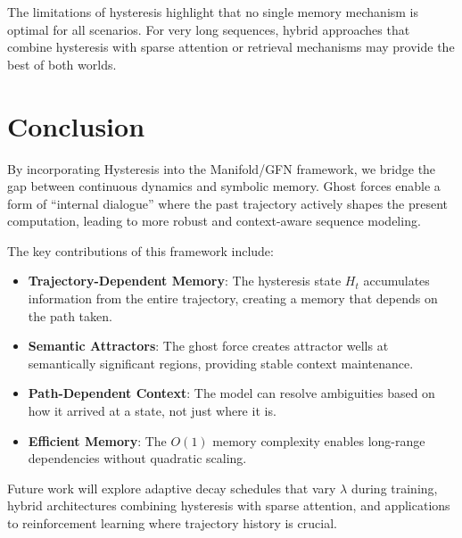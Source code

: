 \documentclass[12pt,a4paper]{article}
\begin{document}
The limitations of hysteresis highlight that no single memory mechanism is optimal for all scenarios. For very long sequences, hybrid approaches that combine hysteresis with sparse attention or retrieval mechanisms may provide the best of both worlds.

\section{Conclusion}

By incorporating Hysteresis into the Manifold/GFN framework, we bridge the gap between continuous dynamics and symbolic memory. Ghost forces enable a form of ``internal dialogue'' where the past trajectory actively shapes the present computation, leading to more robust and context-aware sequence modeling.

The key contributions of this framework include:

\begin{itemize}[leftmargin=1cm]
\item \textbf{Trajectory-Dependent Memory}: The hysteresis state $H_t$ accumulates information from the entire trajectory, creating a memory that depends on the path taken.

\item \textbf{Semantic Attractors}: The ghost force creates attractor wells at semantically significant regions, providing stable context maintenance.

\item \textbf{Path-Dependent Context}: The model can resolve ambiguities based on how it arrived at a state, not just where it is.

\item \textbf{Efficient Memory}: The $O(1)$ memory complexity enables long-range dependencies without quadratic scaling.
\end{itemize}

Future work will explore adaptive decay schedules that vary $\lambda$ during training, hybrid architectures combining hysteresis with sparse attention, and applications to reinforcement learning where trajectory history is crucial.

\vfill

\end{document}
